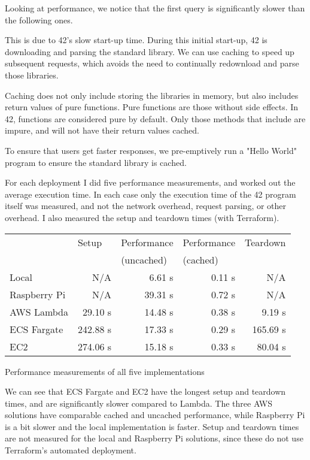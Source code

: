 Looking at performance, we notice that the first query is significantly slower than the following ones.

This is due to 42's slow start-up time. During this initial start-up, 42 is downloading and parsing the standard library. We can use caching to speed up subsequent requests, which avoids the need to continually redownload and parse those libraries.

Caching does not only include storing the libraries in memory, but also includes return values of pure functions. Pure functions are those without side effects. In 42, functions are considered pure by default. Only those methods that include \code{\#\$} are impure, and will not have their return values cached.

To ensure that users get faster responses, we pre-emptively run a "Hello World" program to ensure the standard library is cached.

For each deployment I did five performance measurements, and worked out the average execution time. In each case only the execution time of the 42 program itself was measured, and not the network overhead, request parsing, or other overhead. I also measured the setup and teardown times (with Terraform).

\begin{fig}[H]
\begin{center}
\begin{tabular}{|l|r|r|r|r|}
\hline
\rowcolor{lightpink}
& \multicolumn{1}{l|}{Setup} & \multicolumn{1}{l|}{Performance} & \multicolumn{1}{l|}{Performance} & \multicolumn{1}{l|}{Teardown} \\
\rowcolor{lightpink}
& & \multicolumn{1}{l|}{(uncached)} & \multicolumn{1}{l|}{(cached)} & \\ \hline
Local & N/A & 6.61 s & 0.11 s & N/A \\ \hline
Raspberry Pi & N/A & 39.31 s & 0.72 s & N/A \\ \hline
AWS Lambda & 29.10 s & 14.48 s & 0.38 s & 9.19 s \\ \hline
ECS Fargate & 242.88 s & 17.33 s & 0.29 s & 165.69 s \\ \hline
EC2 & 274.06 s & 15.18 s & 0.33 s & 80.04 s \\ \hline
\end{tabular}
\caption{Performance measurements of all five implementations}
\end{center}
\end{fig}

We can see that ECS Fargate and EC2 have the longest setup and teardown times, and are significantly slower compared to Lambda. The three AWS solutions have comparable cached and uncached performance, while Raspberry Pi is a bit slower and the local implementation is faster. Setup and teardown times are not measured for the local and Raspberry Pi solutions, since these do not use Terraform's automated deployment.

